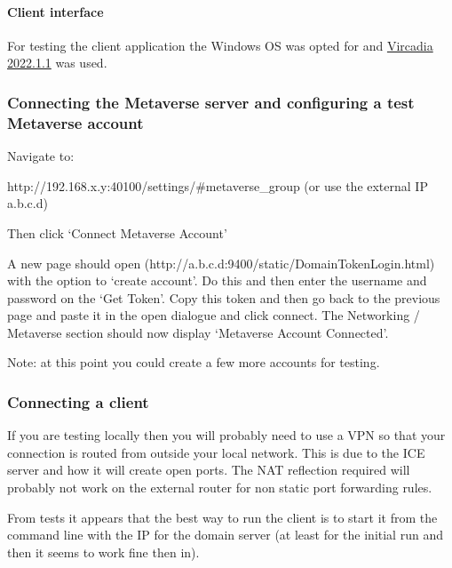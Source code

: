 \hypertarget{client-interface}{%
\paragraph{Client interface}\label{client-interface}}

For testing the client application the Windows OS was opted for and
\href{https://github.com/vircadia/vircadia/releases/tag/2022.1.1}{Vircadia
2022.1.1} was used.

\hypertarget{connecting-the-metaverse-server-and-configuring-a-test-metaverse-account}{%
\subsubsection{Connecting the Metaverse server and configuring a test
Metaverse
account}\label{connecting-the-metaverse-server-and-configuring-a-test-metaverse-account}}

Navigate to:

http://192.168.x.y:40100/settings/\#metaverse\_group (or use the
external IP a.b.c.d)

Then click `Connect Metaverse Account'

A new page should open
(http://a.b.c.d:9400/static/DomainTokenLogin.html) with the option to
`create account'. Do this and then enter the username and password on
the `Get Token'. Copy this token and then go back to the previous page
and paste it in the open dialogue and click connect. The Networking /
Metaverse section should now display `Metaverse Account Connected'.

Note: at this point you could create a few more accounts for testing.

\hypertarget{connecting-a-client}{%
\subsubsection{Connecting a client}\label{connecting-a-client}}

If you are testing locally then you will probably need to use a VPN so
that your connection is routed from outside your local network. This is
due to the ICE server and how it will create open ports. The NAT
reflection required will probably not work on the external router for
non static port forwarding rules.

From tests it appears that the best way to run the client is to start it
from the command line with the IP for the domain server (at least for
the initial run and then it seems to work fine then in).


